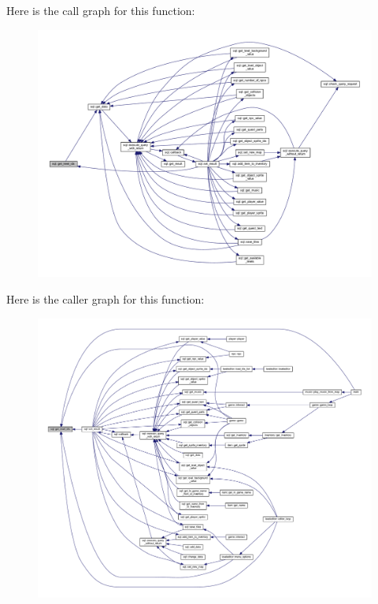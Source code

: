 Here is the call graph for this function\+:
\nopagebreak
\begin{figure}[H]
\begin{center}
\leavevmode
\includegraphics[width=350pt]{classsql_a9928c456c632f88d19cce26b8165bd6f_cgraph}
\end{center}
\end{figure}
Here is the caller graph for this function\+:
\nopagebreak
\begin{figure}[H]
\begin{center}
\leavevmode
\includegraphics[width=350pt]{classsql_a9928c456c632f88d19cce26b8165bd6f_icgraph}
\end{center}
\end{figure}
\mbox{\label{classsql_a1dd21fbf729e949d804ba5509af2b295}} 

